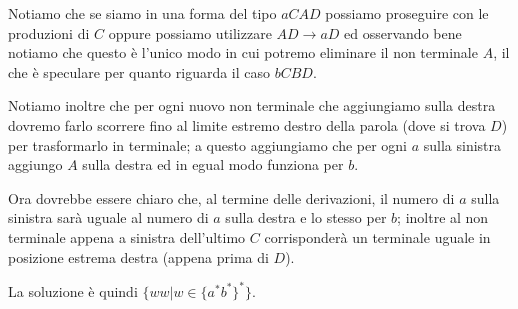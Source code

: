 \documentclass[class=book, crop=false, oneside, 12pt]{standalone}
\begin{document}
Notiamo che se siamo in una forma del tipo $aCAD$ possiamo proseguire con le produzioni di $C$ oppure possiamo utilizzare $AD \to aD$ ed osservando bene notiamo che questo è l'unico modo in cui potremo eliminare il non terminale $A$, il che è speculare per quanto riguarda il caso $bCBD$.

Notiamo inoltre che per ogni nuovo non terminale che aggiungiamo sulla destra dovremo farlo scorrere fino al limite estremo destro della parola (dove si trova $D$) per trasformarlo in terminale; a questo aggiungiamo che per ogni $a$ sulla sinistra aggiungo $A$ sulla destra ed in egual modo funziona per $b$.

Ora dovrebbe essere chiaro che, al termine delle derivazioni, il numero di $a$ sulla sinistra  sarà uguale al numero di $a$ sulla destra e lo stesso per $b$; inoltre al non terminale appena a sinistra dell'ultimo $C$ corrisponderà un terminale uguale in posizione estrema destra (appena prima di $D$).

La soluzione è quindi $\{ ww | w \in \{a^* b^*\}^*\}$.
\end{document}
